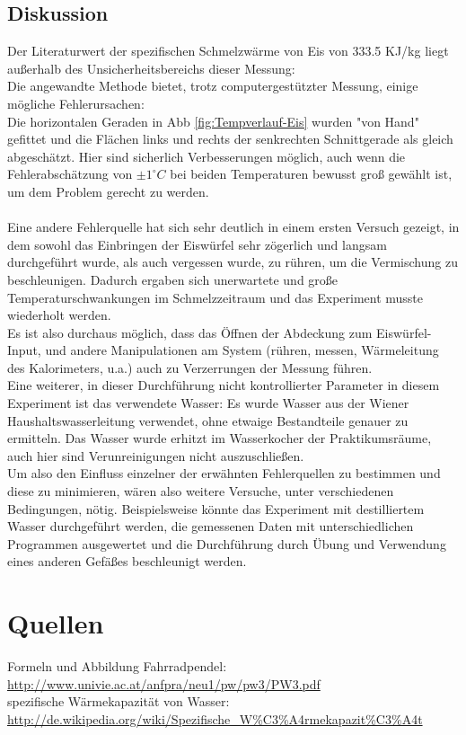 \documentclass[12pt,a4paper]{article}
\begin{document}
\begin{multicols}{2}
\subsection{Diskussion}
Der Literaturwert der spezifischen Schmelzwärme von Eis von 333.5 KJ/kg liegt außerhalb des Unsicherheitsbereichs dieser Messung:\\
Die angewandte Methode bietet, trotz computergestützter Messung, einige mögliche Fehlerursachen:\\
Die horizontalen Geraden in Abb \ref{fig:Tempverlauf-Eis} wurden "von Hand" gefittet und die Flächen links und rechts der senkrechten Schnittgerade als gleich abgeschätzt. Hier sind sicherlich Verbesserungen möglich, auch wenn die Fehlerabschätzung von $\pm 1 ^\circ C$ bei beiden Temperaturen bewusst groß gewählt ist, um dem Problem gerecht zu werden.\\
\\
Eine andere Fehlerquelle hat sich sehr deutlich in einem ersten Versuch gezeigt, in dem sowohl das Einbringen der Eiswürfel sehr zögerlich und langsam durchgeführt wurde, als auch vergessen wurde, zu rühren, um die Vermischung zu beschleunigen. Dadurch ergaben sich unerwartete und große Temperaturschwankungen im Schmelzzeitraum und das Experiment musste wiederholt werden.\\
Es ist also durchaus möglich, dass das Öffnen der Abdeckung zum Eiswürfel-Input, und andere Manipulationen am System (rühren, messen, Wärmeleitung des Kalorimeters, u.a.) auch zu Verzerrungen der Messung führen.\\
Eine weiterer, in dieser Durchführung nicht kontrollierter Parameter in diesem Experiment ist das verwendete Wasser: Es wurde Wasser aus der Wiener Haushaltswasserleitung verwendet, ohne etwaige Bestandteile genauer zu ermitteln. Das Wasser wurde erhitzt im Wasserkocher der Praktikumsräume, auch hier sind Verunreinigungen nicht auszuschließen.\\
Um also den Einfluss einzelner der erwähnten Fehlerquellen zu bestimmen und diese zu minimieren, wären also weitere Versuche, unter verschiedenen Bedingungen, nötig. Beispielsweise könnte das Experiment mit destilliertem Wasser durchgeführt werden, die gemessenen Daten mit unterschiedlichen Programmen ausgewertet und die Durchführung durch Übung und Verwendung eines anderen Gefäßes beschleunigt werden.


\section{Quellen}
Formeln und Abbildung Fahrradpendel:\\
\url{http://www.univie.ac.at/anfpra/neu1/pw/pw3/PW3.pdf}\\

\noindent spezifische Wärmekapazität von Wasser:\\
\url{http://de.wikipedia.org/wiki/Spezifische_W%C3%A4rmekapazit%C3%A4t}

\end{multicols}
\end{document}
